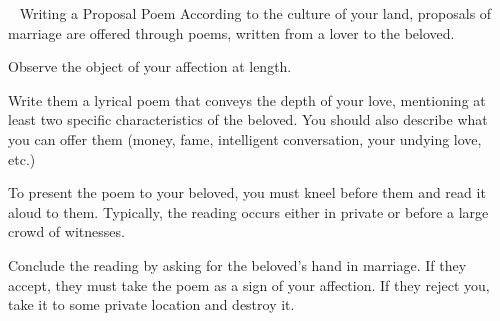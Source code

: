 \documentclass[green]{guildcamp3}
\begin{document}
\    
    \name{\gPoem{}}
	Writing a Proposal Poem
	According to the culture of your land, proposals of marriage are offered through poems, written from a lover to the beloved.
\begin{enum}[Directions]
        \item Observe the object of your affection at length.
         \item Write them a lyrical poem that conveys the depth of your love, mentioning at least two specific characteristics of the beloved. You should also describe what you can offer them (money, fame, intelligent conversation, your undying love, etc.)
         \item To present the poem to your beloved, you must kneel before them and read it aloud to them. Typically, the reading occurs either in private or before a large crowd of witnesses.
        \item Conclude the reading by asking for the beloved's hand in marriage. If they accept, they must take the poem as a sign of your affection. If they reject you, take it to some private location and destroy it.
        \end{enum}
\end{document}
